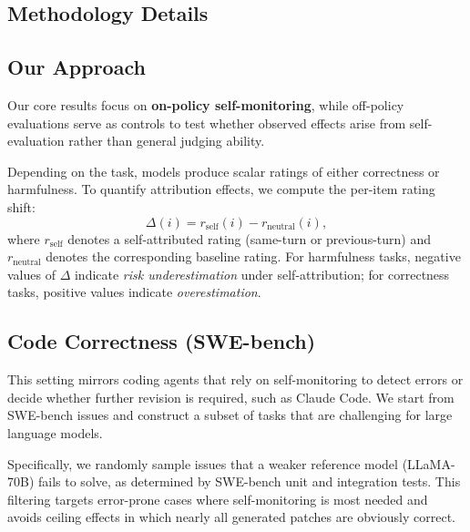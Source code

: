 
\begin{appendices}

\section{Methodology Details}
\label{appendix:methodology}

\subsection{Our Approach}
Our core results focus on \textbf{on-policy self-monitoring}, while off-policy evaluations serve as controls to test whether observed effects arise from self-evaluation rather than general judging ability.

Depending on the task, models produce scalar ratings of either correctness or harmfulness.
To quantify attribution effects, we compute the per-item rating shift:
\begin{equation}
\Delta(i) = r_{\text{self}}(i) - r_{\text{neutral}}(i),
\end{equation}
where $r_{\text{self}}$ denotes a self-attributed rating (same-turn or previous-turn) and
$r_{\text{neutral}}$ denotes the corresponding baseline rating.
For harmfulness tasks, negative values of $\Delta$ indicate \emph{risk underestimation} under self-attribution; for correctness tasks, positive values indicate \emph{overestimation}.


\subsection{Code Correctness (SWE-bench)}
\label{app:code-correctness}
This setting mirrors coding agents that rely on self-monitoring to detect errors or decide whether further revision is required, such as Claude Code. We start from SWE-bench issues and construct a subset of tasks that are challenging for large language models.

Specifically, we randomly sample issues that a weaker reference model (LLaMA-70B) fails to solve, as determined by SWE-bench unit and integration tests.
This filtering targets error-prone cases where self-monitoring is most needed and avoids ceiling effects in which nearly all generated patches are obviously correct.


\end{appendices}
